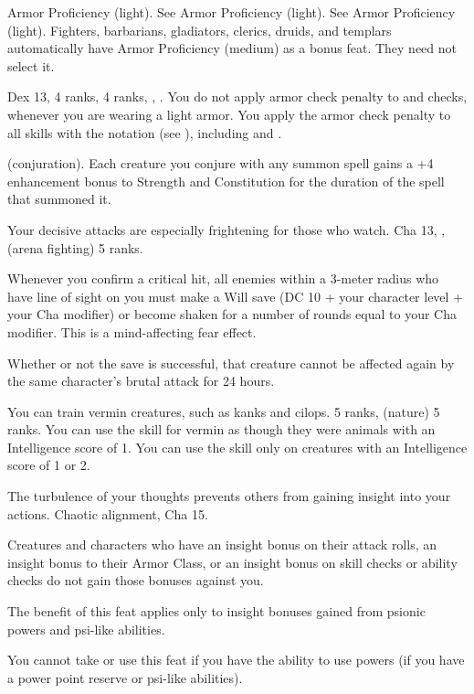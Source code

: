 {}
{Armor Proficiency (light).}
{See Armor Proficiency (light).}
{See Armor Proficiency (light).}
{Fighters, barbarians, gladiators, clerics, druids, and templars automatically have Armor Proficiency (medium) as a bonus feat. They need not select it.}

{}
{Dex 13,  4 ranks,  4 ranks, , .}
{You do not apply armor check penalty to  and  checks, whenever you are wearing a light armor.}
{You apply the armor check penalty to all skills with the notation (see ), including  and .}
{}

{ (conjuration).}
{Each creature you conjure with any summon spell gains a +4 enhancement bonus to Strength and Constitution for the duration of the spell that summoned it.}

{Your decisive attacks are especially frightening for those who watch.}
{Cha 13, ,  (arena fighting) 5 ranks.}
{Whenever you confirm a critical hit, all enemies within a 3-meter radius who have line of sight on you must make a Will save (DC 10 + \onehalf your character level + your Cha modifier) or become shaken for a number of rounds equal to your Cha modifier. This is a mind-affecting fear effect.

Whether or not the save is successful, that creature cannot be affected again by the same character's brutal attack for 24 hours.}{}{}

{You can train vermin creatures, such as kanks and cilops.}
{ 5 ranks,  (nature) 5 ranks.}
{You can use the  skill for vermin as though they were animals with an Intelligence score of 1.}
{You can use the  skill only on creatures with an Intelligence score of 1 or 2.}
{}

{The turbulence of your thoughts prevents others from gaining insight into your actions.}
{Chaotic alignment, Cha 15.}
{Creatures and characters who have an insight bonus on their attack rolls, an insight bonus to their Armor Class, or an insight bonus on skill checks or ability checks do not gain those bonuses against you.

The benefit of this feat applies only to insight bonuses gained from psionic powers and psi-like abilities. %
}{}
{You cannot take or use this feat if you have the ability to use powers (if you have a power point reserve or psi-like abilities).}

